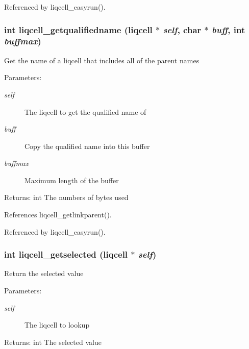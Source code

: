 Referenced by liqcell\_\-easyrun().
\subsubsection[{liqcell\_\-getqualifiedname}]{\setlength{\rightskip}{0pt plus 5cm}int liqcell\_\-getqualifiedname (liqcell $\ast$ {\em self}, \/  char $\ast$ {\em buff}, \/  int {\em buffmax})}\label{d5/da2/liqcell_8c_b6bf85dc93a329d865eaa8fad6374c2d}


Get the name of a liqcell that includes all of the parent names \begin{Desc}
\item[Parameters:]
\begin{description}
\item[{\em self}]The liqcell to get the qualified name of \item[{\em buff}]Copy the qualified name into this buffer \item[{\em buffmax}]Maximum length of the buffer \end{description}
\end{Desc}
\begin{Desc}
\item[Returns:]int The numbers of bytes used \end{Desc}


References liqcell\_\-getlinkparent().

Referenced by liqcell\_\-easyrun().
\subsubsection[{liqcell\_\-getselected}]{\setlength{\rightskip}{0pt plus 5cm}int liqcell\_\-getselected (liqcell $\ast$ {\em self})}\label{d5/da2/liqcell_8c_61b6c0b395afa1c6fd0f48104f288a05}


Return the selected value \begin{Desc}
\item[Parameters:]
\begin{description}
\item[{\em self}]The liqcell to lookup \end{description}
\end{Desc}
\begin{Desc}
\item[Returns:]int The selected value \end{Desc}
